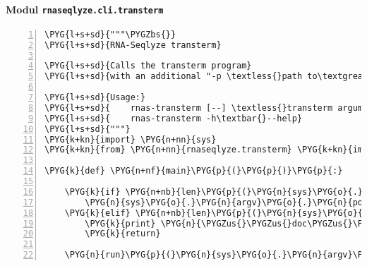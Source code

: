 \paragraph{Modul \texttt{rnaseqlyze.cli.transterm}}
\label{rnaseqlyze-pdf:modul-rnaseqlyze-cli-transterm}
\begin{Verbatim}[commandchars=\\\{\},numbers=left,firstnumber=1,stepnumber=5]
\PYG{l+s+sd}{"""\PYGZbs{}}
\PYG{l+s+sd}{RNA-Seqlyze transterm}

\PYG{l+s+sd}{Calls the transterm program}
\PYG{l+s+sd}{with an additional "-p \textless{}path to\textgreater{}/expterm.dat" argument.}

\PYG{l+s+sd}{Usage:}
\PYG{l+s+sd}{    rnas-transterm [--] \textless{}transterm arguments\textgreater{} ...}
\PYG{l+s+sd}{    rnas-transterm -h\textbar{}--help}
\PYG{l+s+sd}{"""}
\PYG{k+kn}{import} \PYG{n+nn}{sys}
\PYG{k+kn}{from} \PYG{n+nn}{rnaseqlyze.transterm} \PYG{k+kn}{import} \PYG{n}{run}

\PYG{k}{def} \PYG{n+nf}{main}\PYG{p}{(}\PYG{p}{)}\PYG{p}{:}

    \PYG{k}{if} \PYG{n+nb}{len}\PYG{p}{(}\PYG{n}{sys}\PYG{o}{.}\PYG{n}{argv}\PYG{p}{)} \PYG{o}{\textgreater{}} \PYG{l+m+mi}{1} \PYG{o+ow}{and} \PYG{n}{sys}\PYG{o}{.}\PYG{n}{argv}\PYG{p}{[}\PYG{l+m+mi}{1}\PYG{p}{]} \PYG{o}{==} \PYG{l+s}{'}\PYG{l+s}{--}\PYG{l+s}{'}\PYG{p}{:}
        \PYG{n}{sys}\PYG{o}{.}\PYG{n}{argv}\PYG{o}{.}\PYG{n}{pop}\PYG{p}{(}\PYG{l+m+mi}{1}\PYG{p}{)}
    \PYG{k}{elif} \PYG{n+nb}{len}\PYG{p}{(}\PYG{n}{sys}\PYG{o}{.}\PYG{n}{argv}\PYG{p}{)} \PYG{o}{\textless{}} \PYG{l+m+mi}{2} \PYG{o+ow}{or} \PYG{n}{sys}\PYG{o}{.}\PYG{n}{argv}\PYG{p}{[}\PYG{l+m+mi}{1}\PYG{p}{]} \PYG{o+ow}{in} \PYG{p}{(}\PYG{l+s}{'}\PYG{l+s}{-h}\PYG{l+s}{'}\PYG{p}{,} \PYG{l+s}{'}\PYG{l+s}{--help}\PYG{l+s}{'}\PYG{p}{)}\PYG{p}{:}
        \PYG{k}{print} \PYG{n}{\PYGZus{}\PYGZus{}doc\PYGZus{}\PYGZus{}}
        \PYG{k}{return}

    \PYG{n}{run}\PYG{p}{(}\PYG{n}{sys}\PYG{o}{.}\PYG{n}{argv}\PYG{p}{[}\PYG{l+m+mi}{1}\PYG{p}{:}\PYG{p}{]}\PYG{p}{)}
\end{Verbatim}



